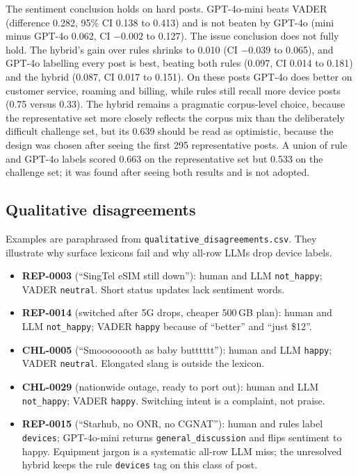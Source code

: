 \documentclass[11pt,a4paper]{article}
\begin{document}
The sentiment conclusion holds on hard posts. GPT-4o-mini beats VADER (difference 0.282, 95\% CI 0.138 to 0.413) and is not beaten by GPT-4o (mini minus GPT-4o 0.062, CI $-0.002$ to 0.127). The issue conclusion does not fully hold. The hybrid's gain over rules shrinks to 0.010 (CI $-0.039$ to 0.065), and GPT-4o labelling every post is best, beating both rules (0.097, CI 0.014 to 0.181) and the hybrid (0.087, CI 0.017 to 0.151). On these posts GPT-4o does better on customer service, roaming and billing, while rules still recall more device posts (0.75 versus 0.33). The hybrid remains a pragmatic corpus-level choice, because the representative set more closely reflects the corpus mix than the deliberately difficult challenge set, but its 0.639 should be read as optimistic, because the design was chosen after seeing the first 295 representative posts. A union of rule and GPT-4o labels scored 0.663 on the representative set but 0.533 on the challenge set; it was found after seeing both results and is not adopted.

\subsection{Qualitative disagreements}

Examples are paraphrased from \texttt{qualitative\_disagreements.csv}. They illustrate why surface lexicons fail and why all-row LLMs drop device labels.

\begin{itemize}
  \item \textbf{REP-0003} (``SingTel eSIM still down''): human and LLM \texttt{not\_happy}; VADER \texttt{neutral}. Short status updates lack sentiment words.
  \item \textbf{REP-0014} (switched after 5G drops, cheaper 500\,GB plan): human and LLM \texttt{not\_happy}; VADER \texttt{happy} because of ``better'' and ``just \$12''.
  \item \textbf{CHL-0005} (``Smoooooooth as baby butttttt''): human and LLM \texttt{happy}; VADER \texttt{neutral}. Elongated slang is outside the lexicon.
  \item \textbf{CHL-0029} (nationwide outage, ready to port out): human and LLM \texttt{not\_happy}; VADER \texttt{happy}. Switching intent is a complaint, not praise.
  \item \textbf{REP-0015} (``Starhub, no ONR, no CGNAT''): human and rules label \texttt{devices}; GPT-4o-mini returns \texttt{general\_discussion} and flips sentiment to happy. Equipment jargon is a systematic all-row LLM miss; the unresolved hybrid keeps the rule \texttt{devices} tag on this class of post.
\end{itemize}
\end{document}
